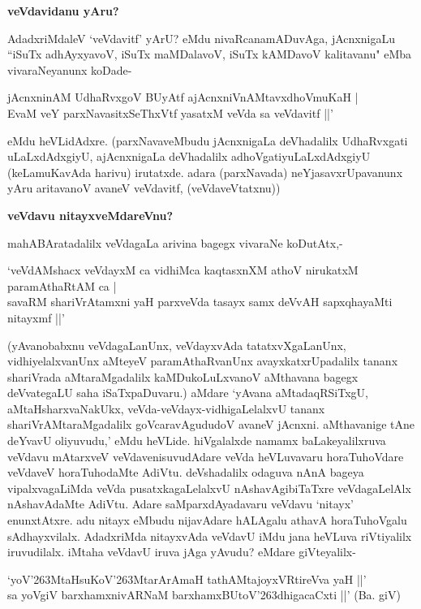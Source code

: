 \noindent
{\bf\large{veVdavidanu yAru?}}\label{page133}

AdadxriMdaleV `veVdavitf' yArU? eMdu nivaRcanamADuvAga, jAcnxnigaLu ``iSuTx adhAyxyavoV, iSuTx maMDalavoV, iSuTx kAMDavoV kalitavanu" eMba vivaraNeyanunx koDade-

\begin{shloka}
jAcnxninAM UdhaRvxgoV BUyAtf ajAcnxniVnAMtavxdhoVmuKaH |\\\label{133}
EvaM veY parxNavasitxSeThxVtf yasatxM veVda sa veVdavitf ||'
\end{shloka}

eMdu heVLidAdxre. (parxNavaveMbudu jAcnxnigaLa deVhadalilx UdhaRvxgati uLaLxdAdxgiyU, ajAcnxnigaLa deVhadalilx adhoVgatiyuLaLxdAdxgiyU (keLamuKavAda harivu) irutatxde. adara (parxNavada) neYjasavxrUpavanunx yAru aritavanoV avaneV veVdavitf, (veVdaveVtatxnu))

\noindent
{\bf\large{veVdavu nitayxveMdareVnu?}}\label{page133}

mahABAratadalilx veVdagaLa arivina bagegx vivaraNe koDutAtx,-

\begin{shloka}
`veVdAMshacx veVdayxM ca vidhiMca kaqtasxnXM athoV nirukatxM paramAthaRtAM ca |\\\label{133}
savaRM shariVrAtamxni yaH parxveVda tasayx samx deVvAH sapxqhayaMti nitayxmf ||'
\end{shloka}

(yAvanobabxnu veVdagaLanUnx, veVdayxvAda tatatxvXgaLanUnx, vidhiyelalxvanUnx aMteyeV paramAthaRvanUnx avayxkatxrUpadalilx tananx shariVrada aMtaraMgadalilx kaMDukoLuLxvanoV aMthavana bagegx deVvategaLU saha iSaTxpaDuvaru.) aMdare `yAvana aMtadaqRSiTxgU, aMtaHsharxvaNakUkx, veVda-veVdayx-vidhigaLelalxvU tananx shariVrAMtaraMgadalilx goVcaravAgududoV avaneV jAcnxni. aMthavanige tAne deYvavU oliyuvudu,' eMdu heVLide. hiVgalalxde namamx baLakeyalilxruva veVdavu mAtarxveV veVdavenisuvudAdare veVda heVLuvavaru horaTuhoVdare veVdaveV horaTuhodaMte AdiVtu. deVshadalilx odaguva nAnA bageya vipalxvagaLiMda veVda pusatxkagaLelalxvU nAshavAgibiTaTxre veVdagaLelAlx nAshavAdaMte AdiVtu. Adare saMparxdAyadavaru veVdavu `nitayx' enunxtAtxre. adu nitayx eMbudu nijavAdare hALAgalu athavA horaTuhoVgalu sAdhayxvilalx. AdadxriMda nitayxvAda veVdavU iMdu jana heVLuva riVtiyalilx iruvudilalx. iMtaha veVdavU iruva jAga yAvudu? eMdare giVteyalilx-

\begin{shloka}
`yoV\char'263MtaHsuKoV\char'263MtarArAmaH tathAMtajoyxVRtireVva yaH ||'\\\label{134}
sa yoVgiV barxhamxnivARNaM barxhamxBUtoV\char'263dhigacaCxti ||' (Ba. giV)
\end{shloka}


